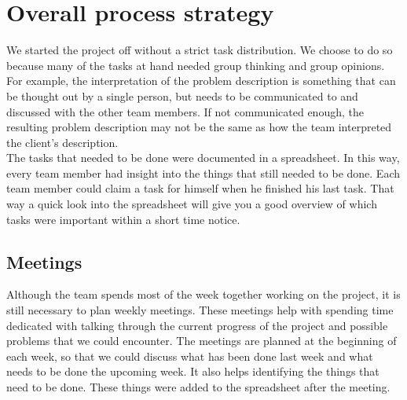 \section{Overall process strategy}
We started the project off without a strict task distribution.
We choose to do so because many of the tasks at hand needed group thinking and group opinions.
For example, the interpretation of the problem description is something that can be thought out by a single person, but needs to be communicated to and discussed with the other team members.
If not communicated enough, the resulting problem description may not be the same as how the team interpreted the client's description.\\
The tasks that needed to be done were documented in a spreadsheet.
In this way, every team member had insight into the things that still needed to be done.
Each team member could claim a task for himself when he finished his last task.
That way a quick look into the spreadsheet will give you a good overview of which tasks were important within a short time notice.

\subsection{Meetings}
Although the team spends most of the week together working on the project, it is still necessary to plan weekly meetings.
These meetings help with spending time dedicated with talking through the current progress of the project and possible problems that we could encounter.
The meetings are planned at the beginning of each week, so that we could discuss what has been done last week and what needs to be done the upcoming week.
It also helps identifying the things that need to be done. These things were added to the spreadsheet after the meeting.

